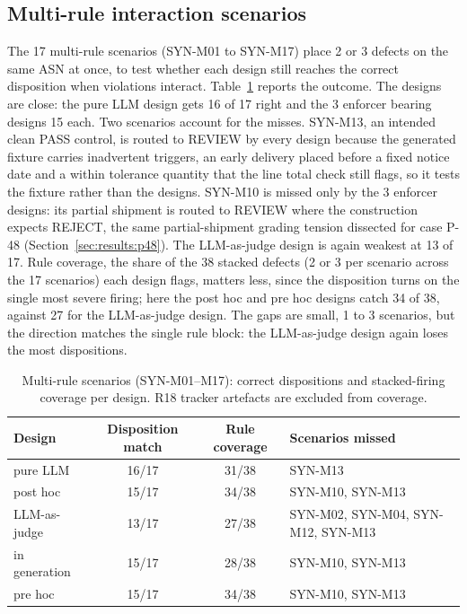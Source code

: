 \subsection{Multi-rule interaction scenarios}
\label{sec:results:multirule}

The 17 multi-rule scenarios (SYN-M01 to SYN-M17) place 2 or 3 defects on the same ASN at once, to test whether each design still reaches the correct disposition when violations interact. Table~\ref{tab:synthetic_multirule} reports the outcome. The designs are close: the pure LLM design gets 16 of 17 right and the 3 enforcer bearing designs 15 each. Two scenarios account for the misses. SYN-M13, an intended clean PASS control, is routed to REVIEW by every design because the generated fixture carries inadvertent triggers, an early delivery placed before a fixed notice date and a within tolerance quantity that the line total check still flags, so it tests the fixture rather than the designs. SYN-M10 is missed only by the 3 enforcer designs: its partial shipment is routed to REVIEW where the construction expects REJECT, the same partial-shipment grading tension dissected for case P-48 (Section~\ref{sec:results:p48}). The LLM-as-judge design is again weakest at 13 of 17. Rule coverage, the share of the 38 stacked defects (2 or 3 per scenario across the 17 scenarios) each design flags, matters less, since the disposition turns on the single most severe firing; here the post hoc and pre hoc designs catch 34 of 38, against 27 for the LLM-as-judge design. The gaps are small, 1 to 3 scenarios, but the direction matches the single rule block: the LLM-as-judge design again loses the most dispositions.

\begin{table}[htb]
\centering
\caption{Multi-rule scenarios (SYN-M01--M17): correct dispositions and stacked-firing coverage per design. R18 tracker artefacts are excluded from coverage.}
\label{tab:synthetic_multirule}
\footnotesize
\begin{tabular}{@{}lccl@{}}
\toprule
\textbf{Design} & \textbf{Disposition match} & \textbf{Rule coverage} & \textbf{Scenarios missed} \\
\midrule
pure LLM      & 16/17 & 31/38 & SYN-M13 \\
post hoc      & 15/17 & 34/38 & SYN-M10, SYN-M13 \\
LLM-as-judge  & 13/17 & 27/38 & SYN-M02, SYN-M04, SYN-M12, SYN-M13 \\
in generation & 15/17 & 28/38 & SYN-M10, SYN-M13 \\
pre hoc       & 15/17 & 34/38 & SYN-M10, SYN-M13 \\
\bottomrule
\end{tabular}
\end{table}


